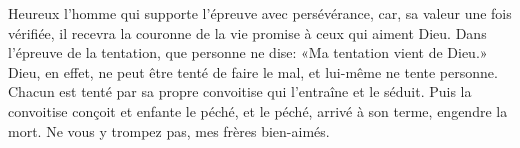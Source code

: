 Heureux l’homme qui supporte l’épreuve avec persévérance,
	car, sa valeur une fois vérifiée,
	il recevra la couronne de la vie promise à ceux qui aiment Dieu.
Dans l’épreuve de la tentation, que personne ne dise:
	«Ma tentation vient de Dieu.»
Dieu, en effet, ne peut être tenté de faire le mal,
	et lui-même ne tente personne.
Chacun est tenté par sa propre convoitise qui l’entraîne et le séduit.
	Puis la convoitise conçoit et enfante le péché,
	et le péché, arrivé à son terme, engendre la mort.
Ne vous y trompez pas, mes frères bien-aimés.
